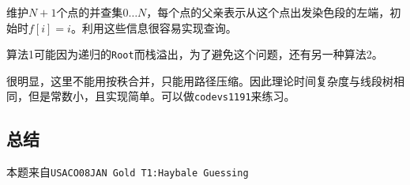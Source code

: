 \documentclass[hyperref,UTF8,12pt,a4paper]{ctexart}
\begin{document}
维护$N+1$个点的并查集$0\dots N$，每个点的父亲表示从这个点出发染色段的左端，初始时$f[i]=i$。利用这些信息很容易实现查询。

\begin{algorithm}
\caption{}
\begin{algorithmic}[1]
\EndWhile
\EndProcedure
\end{algorithmic}
\end{algorithm}

算法1可能因为递归的\verb|Root|而栈溢出，为了避免这个问题，还有另一种算法2。

\begin{algorithm}
\caption{}
\begin{algorithmic}[1]
\Else
{}
\EndIf
\EndWhile
\EndProcedure
\end{algorithmic}
\end{algorithm}

很明显，这里不能用按秩合并，只能用路径压缩。因此理论时间复杂度与线段树相同，但是常数小，且实现简单。可以做\verb|codevs1191|来练习。

\subsection{总结}

本题来自\verb|USACO08JAN Gold T1:Haybale Guessing|
\end{document}
